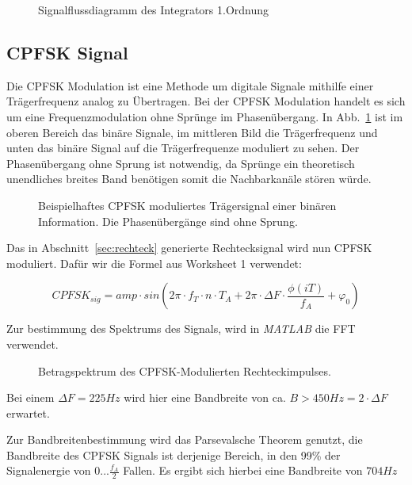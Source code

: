 \documentclass{article}
\begin{document}
\begin{figure}[!h]
    \centering
    \def\svgscale{0.3}
    \caption{Signalflussdiagramm des Integrators 1.Ordnung}
\end{figure}

\subsection{\ac{CPFSK} Signal}

Die \ac{CPFSK} Modulation ist eine Methode um digitale Signale mithilfe einer Trägerfrequenz analog zu Übertragen.
Bei der \ac{CPFSK} Modulation handelt es sich um eine Frequenzmodulation ohne Sprünge im Phasenübergang. In Abb.~\ref{fsk}
ist im oberen Bereich das binäre Signale, im mittleren Bild die Trägerfrequenz und unten das binäre Signal auf die Trägerfrequenze
moduliert zu sehen. Der Phasenübergang ohne Sprung ist notwendig, da Sprünge ein theoretisch unendliches breites Band benötigen
somit die Nachbarkanäle stören würde.
\begin{figure}[!h]
    \centering

    \def\svgwidth{0.6\columnwidth}
    \caption{Beispielhaftes \ac{CPFSK} moduliertes Trägersignal einer binären 
    Information. Die Phasenübergänge sind ohne Sprung. }%
    \label{fsk}
\end{figure}

Das in Abschnitt~\ref{sec:rechteck} generierte Rechtecksignal wird nun \ac{CPFSK} moduliert.
Dafür wir die Formel aus Worksheet 1 verwendet:

$$CPFSK_{sig} = amp \cdot  sin(2  \pi \cdot f_T \cdot n \cdot T_A + 2 \pi \cdot \varDelta{F} \cdot \frac{\phi (iT)}{f_A} + \varphi_0) $$

Zur bestimmung des Spektrums des Signals, wird in \textit{MATLAB} die FFT verwendet.
\begin{figure}[!h]
    \centering
    \def\svgscale{0.3}
    \def\svgwidth{\columnwidth}
%    
    \caption{Betragspektrum des \ac{CPFSK}-Modulierten Rechteckimpulses.}
\end{figure}
Bei einem $\varDelta F = 225Hz$ wird hier eine Bandbreite von ca. $B > 450Hz = 2\cdot \varDelta F $ erwartet.

Zur Bandbreitenbestimmung wird das Parsevalsche Theorem genutzt, die Bandbreite des \ac{CPFSK} Signals ist derjenige Bereich,
in den 99\% der Signalenergie von $0...\frac{f_A}{2}$ Fallen. Es ergibt sich hierbei eine Bandbreite von $704Hz$
\end{document}
